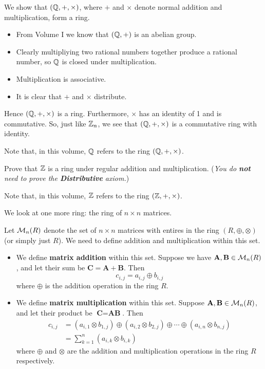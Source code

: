 \begin{example}
    We show that $(\mathbb{Q}, +, \times)$, where $+$ and $\times$ denote normal addition and multiplication, form a ring.
    \begin{itemize}
        \item From Volume I we know that $(\mathbb{Q}, +)$ is an abelian group.
        \item Clearly multipliying two rational numbers together produce a rational number, so $\mathbb{Q}$ is closed under multiplication.
        \item Multiplication is associative.
        \item It is clear that $+$ and $\times$ distribute.
    \end{itemize}
    Hence $(\mathbb{Q}, +, \times)$ is a ring. Furthermore, $\times$ has an identity of 1 and is commutative. So, just like $\mathbb{Z}_{n}$, we see that $(\mathbb{Q}, +, \times)$ is a commutative ring with identity.

    Note that, in this volume, $\mathbb{Q}$ refers to the ring $(\mathbb{Q}, +, \times)$.
\end{example}

\begin{exercise}
    Prove that $\mathbb{Z}$ is a ring under regular addition and multiplication.\newline
    (\textit{You do \textbf{not} need to prove the \textbf{Distributive} axiom.})
\end{exercise}
Note that, in this volume, $\mathbb{Z}$ refers to the ring $(\mathbb{Z}, +, \times)$.

We look at one more ring: the ring of $n \times n$ matrices.

Let $\mathcal{M}_{n}(R)$ denote the set of $n\times n$ matrices with entires in the ring $(R, \oplus, \otimes)$ (or simply just $R$).
We need to define addition and multiplication within this set.
\begin{itemize}
    \item We define \textbf{matrix addition} within this set. Suppose we have $\textbf{A}, \textbf{B} \in \mathcal{M}_{n}(R)$, and let their sum be $\textbf{C} = \textbf{A} + \textbf{B}$. Then
    \[
        c_{i,j} = a_{i,j} \oplus b_{i,j}    
    \]
    where $\oplus$ is the addition operation in the ring $R$.
    
    \item We define \textbf{matrix multiplication} within this set. Suppose $\textbf{A}, \textbf{B} \in \mathcal{M}_{n}(R)$, and let their product be $\textbf{C} = \textbf{AB}$. Then
    \begin{align*}
        c_{i,j} &= (a_{i,1}\otimes b_{1,j}) \oplus (a_{i,2}\otimes b_{2,j}) \oplus \cdots \oplus (a_{i,n}\otimes b_{n,j})\\
        &= \sum_{k=1}^n (a_{i,k}\otimes b_{i,k})
    \end{align*}
    where $\oplus$ and $\otimes$ are the addition and multiplication operations in the ring $R$ respectively.
\end{itemize}

